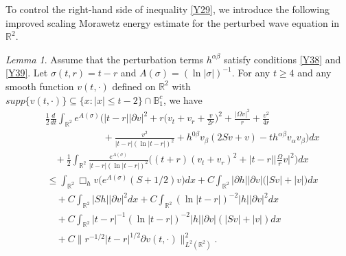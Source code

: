 \documentclass[11pt, reqno]{amsart}
\theoremstyle{definition}
\theoremstyle{remark}
\newtheorem{lem}[thm]{Lemma}
\theoremstyle{definition}
\numberwithin{equation}{section}
\numberwithin{equation}{section}
\def\leq{\leqslant}
\def\geq{\geqslant}
\begin{document}
To control the right-hand side of inequality \eqref{Y29}, we introduce
the following improved scaling Morawetz energy estimate for the
perturbed wave equation in $\mathbb R^2$.
\begin{lem}\label{lem6}
Assume that the perturbation terms $h^{\alpha\beta}$ satisfy conditions \eqref{Y38} and \eqref{Y39}. Let $\sigma(t,r)=t-r$ and $A(\sigma)=(\ln|\sigma|)^{-1}$. 
For any $t\geq4$ and any smooth function $v(t,\cdot)$ defined on $\mathbb R^2$ with $supp\{v(t,\cdot)\}\subseteq\{x:|x|\leq t-2\}\cap\mathbb B_1^c$, we have
\begin{align*}
&\frac12\frac{d}{dt}\int_{\mathbb R^2}e^{A(\sigma)}\Big(|t-r||\partial v|^2
+r\Big(v_t+v_r+\frac v{2r}\Big)^2+\frac{|\Omega v|^2}r+\frac{v^2}{4r}
\nonumber\\&\qquad\qquad\qquad+\frac{v^2}{|t-r|(\ln|t-r|)^2}
+h^{0\beta}v_{\beta}(2Sv+v)-th^{\alpha\beta}v_{\alpha}v_{\beta}\Big)dx
\nonumber\\&\quad+\frac12\int_{\mathbb R^2}\frac{e^{A(\sigma)}}{|t-r|(\ln|t-r|)^2}\Big((t+r)(v_t+v_r)^2
+|t-r|\Big|\frac{\Omega}rv\Big|^2\Big)dx
\end{align*}
\begin{align}\label{Y2}
&\leq\int_{\mathbb R^2}\Box_h v
\big(e^{A(\sigma)}(S+1/2)v\big)dx
+C\int_{\mathbb R^2}|\partial h||\partial v|\big(|Sv|+|v|\big)dx
\nonumber\\&\quad+C\int_{\mathbb R^2}|Sh||\partial v|^2dx+C\int_{\mathbb R^2}(\ln|t-r|)^{-2}|h||\partial v|^2dx
\nonumber\\&\quad+C\int_{\mathbb R^2}|t-r|^{-1}(\ln|t-r|)^{-2}|h||\partial v|(|Sv|+|v|)dx
\nonumber\\&\quad+C\|r^{-1/2}|t-r|^{1/2}\partial v(t,\cdot)\|^2_{L^2(\mathbb R^2)}.
\end{align}
\end{lem}
\end{document}
